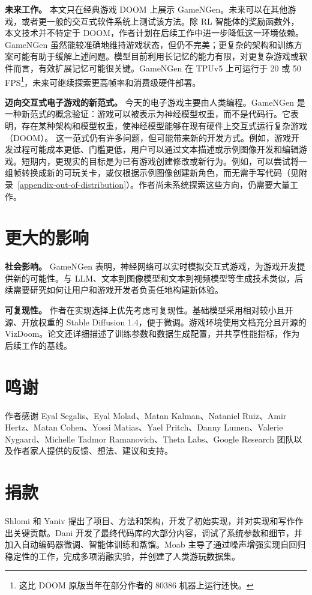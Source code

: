 \documentclass{article} %
\begin{document}
\textbf{未来工作。} 本文只在经典游戏 DOOM 上展示 GameNGen。未来可以在其他游戏，或者更一般的交互式软件系统上测试该方法。除 RL 智能体的奖励函数外，本文技术并不特定于 DOOM，作者计划在后续工作中进一步降低这一环境依赖。GameNGen 虽然能较准确地维持游戏状态，但仍不完美；更复杂的架构和训练方案可能有助于缓解上述问题。模型目前利用长记忆的能力有限，对更复杂游戏或软件而言，有效扩展记忆可能很关键。GameNGen 在 TPUv5 上可运行于 20 或 50 FPS\footnote{这比 DOOM 原版当年在部分作者的 80386 机器上运行还快。}，未来可继续探索更高帧率和消费级硬件部署。

\textbf{迈向交互式电子游戏的新范式。}
\label{appendix:new paradigm}
今天的电子游戏主要由人类编程。GameNGen 是一种新范式的概念验证：游戏可以被表示为神经模型权重，而不是代码行。它表明，存在某种架构和模型权重，使神经模型能够在现有硬件上交互式运行复杂游戏（DOOM）。
这一范式仍有许多问题，但可能带来新的开发方式。例如，游戏开发过程可能成本更低、门槛更低，用户可以通过文本描述或示例图像开发和编辑游戏。短期内，更现实的目标是为已有游戏创建修改或新行为。例如，可以尝试将一组帧转换成新的可玩关卡，或仅根据示例图像创建新角色，而无需手写代码（见附录~\ref{appendix-out-of-distribution}）。作者尚未系统探索这些方向，仍需要大量工作。

\section*{更大的影响}
\textbf{社会影响。} GameNGen 表明，神经网络可以实时模拟交互式游戏，为游戏开发提供新的可能性。与 LLM、文本到图像模型和文本到视频模型等生成技术类似，后续需要研究如何让用户和游戏开发者负责任地构建新体验。

\textbf{可复现性。} 作者在实现选择上优先考虑可复现性。基础模型采用相对较小且开源、开放权重的 Stable Diffusion 1.4，便于微调。游戏环境使用文档充分且开源的 VizDoom。论文还详细描述了训练参数和数据生成配置，并共享性能指标，作为后续工作的基线。

\section*{鸣谢}

作者感谢 Eyal Segalis、Eyal Molad、Matan Kalman、Nataniel Ruiz、Amir Hertz、Matan Cohen、Yossi Matias、Yael Pritch、Danny Lumen、Valerie Nygaard、Michelle Tadmor Ramanovich、Theta Labs、Google Research 团队以及作者家人提供的反馈、想法、建议和支持。

\section*{捐款}
Shlomi 和 Yaniv 提出了项目、方法和架构，开发了初始实现，并对实现和写作作出关键贡献。Dani 开发了最终代码库的大部分内容，调试了系统参数和细节，并加入自动编码器微调、智能体训练和蒸馏。Moab 主导了通过噪声增强实现自回归稳定性的工作，完成多项消融实验，并创建了人类游玩数据集。
\end{document}
